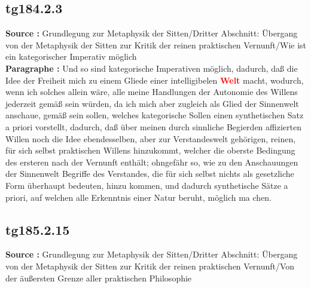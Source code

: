 \documentclass[a4paper,12pt,twoside]{book}
\newcommand{\match}[1]{\textcolor{red}{\textbf{#1}}}
\begin{document}
	\subsection*{tg184.2.3} 
	\textbf{Source : }Grundlegung zur Metaphysik der Sitten/Dritter Abschnitt: Übergang von der Metaphysik der Sitten zur Kritik der reinen praktischen Vernunft/Wie ist ein kategorischer Imperativ möglich\\  
	
	\noindent\textbf{Paragraphe : }Und so sind kategorische Imperativen möglich, dadurch, daß die Idee der Freiheit mich zu einem Gliede einer intelligibelen \match{Welt} macht, wodurch, wenn ich solches allein wäre, alle meine Handlungen der Autonomie des Willens jederzeit gemäß sein würden, da ich mich aber zugleich als Glied der Sinnenwelt anschaue, gemäß sein sollen, welches kategorische Sollen einen synthetischen Satz a priori vorstellt, dadurch, daß über meinen durch sinnliche Begierden affizierten Willen noch die Idee ebendesselben, aber zur Verstandeswelt gehörigen, reinen, für sich selbst praktischen Willens hinzukommt, welcher die oberste Bedingung des ersteren nach der Vernunft enthält; ohngefähr so, wie zu den Anschauungen der Sinnenwelt Begriffe des Verstandes, die für sich selbst nichts als gesetzliche Form überhaupt bedeuten, hinzu kommen, und dadurch synthetische Sätze a priori, auf welchen alle Erkenntnis einer Natur beruht, möglich ma chen. 
	
	\subsection*{tg185.2.15} 
	\textbf{Source : }Grundlegung zur Metaphysik der Sitten/Dritter Abschnitt: Übergang von der Metaphysik der Sitten zur Kritik der reinen praktischen Vernunft/Von der äußersten Grenze aller praktischen Philosophie\\  
	
\end{document}
